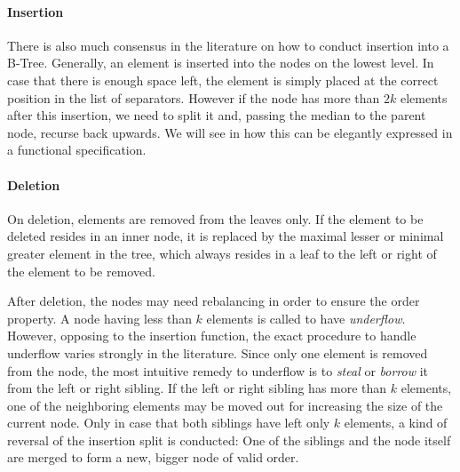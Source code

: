 \paragraph{Insertion}\label{par:intro-ins}
There is also much consensus in the literature on how to conduct insertion into a B-Tree.
\parencite{DBLP:journals/csur/Comer79}
Generally, an element is inserted into the nodes on the lowest level.
In case that there is enough space left, the element is simply placed at the correct
position in the list of separators.
However if the node has more than $2k$ elements after this insertion,
we need to split it and, passing the median to the parent node,
recurse back upwards.
We will see in  how this can be
elegantly expressed in a functional specification.

\paragraph{Deletion}\label{par:intro-del}
On deletion, elements are removed from the leaves only.
If the element to be deleted resides in an inner node,
it is replaced by the maximal lesser or minimal greater
element in the tree, which always resides in a leaf
to the left or right of the element to be removed.

After deletion, the nodes may need rebalancing in order
to ensure the order property.
A node having less than $k$ elements is called to have \textit{underflow}.
However, opposing to the insertion function,
the exact procedure to handle underflow varies strongly in the literature.
Since only one element is removed from the node,
the most intuitive remedy to underflow is to \textit{steal} or \textit{borrow} it
from the left or right sibling.\parencite{DBLP:books/daglib/0023376}
If the left or right sibling has more than $k$ elements,
one of the neighboring elements may be moved out for increasing
the size of the current node.
Only in case that both siblings have left only $k$ elements,
a kind of reversal of the insertion split is conducted:
One of the siblings and the node itself are merged to form
a new, bigger node of valid order.

